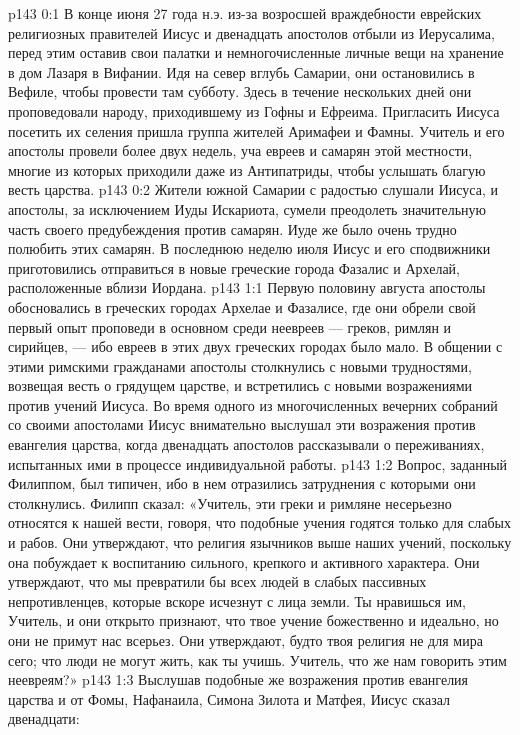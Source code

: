 \author{Комиссия срединников}
\vs p143 0:1 В конце июня 27 года н.э. из\hyp{}за возросшей враждебности еврейских религиозных правителей Иисус и двенадцать апостолов отбыли из Иерусалима, перед этим оставив свои палатки и немногочисленные личные вещи на хранение в дом Лазаря в Вифании. Идя на север вглубь Самарии, они остановились в Вефиле, чтобы провести там субботу. Здесь в течение нескольких дней они проповедовали народу, приходившему из Гофны и Ефреима. Пригласить Иисуса посетить их селения пришла группа жителей Аримафеи и Фамны. Учитель и его апостолы провели более двух недель, уча евреев и самарян этой местности, многие из которых приходили даже из Антипатриды, чтобы услышать благую весть царства.
\vs p143 0:2 Жители южной Самарии с радостью слушали Иисуса, и апостолы, за исключением Иуды Искариота, сумели преодолеть значительную часть своего предубеждения против самарян. Иуде же было очень трудно полюбить этих самарян. В последнюю неделю июля Иисус и его сподвижники приготовились отправиться в новые греческие города Фазалис и Архелай, расположенные вблизи Иордана.
\vs p143 1:1 Первую половину августа апостолы обосновались в греческих городах Архелае и Фазалисе, где они обрели свой первый опыт проповеди в основном среди неевреев --- греков, римлян и сирийцев, --- ибо евреев в этих двух греческих городах было мало. В общении с этими римскими гражданами апостолы столкнулись с новыми трудностями, возвещая весть о грядущем царстве, и встретились с новыми возражениями против учений Иисуса. Во время одного из многочисленных вечерних собраний со своими апостолами Иисус внимательно выслушал эти возражения против евангелия царства, когда двенадцать апостолов рассказывали о переживаниях, испытанных ими в процессе индивидуальной работы.
\vs p143 1:2 Вопрос, заданный Филиппом, был типичен, ибо в нем отразились затруднения с которыми они столкнулись. Филипп сказал: «Учитель, эти греки и римляне несерьезно относятся к нашей вести, говоря, что подобные учения годятся только для слабых и рабов. Они утверждают, что религия язычников выше наших учений, поскольку она побуждает к воспитанию сильного, крепкого и активного характера. Они утверждают, что мы превратили бы всех людей в слабых пассивных непротивленцев, которые вскоре исчезнут с лица земли. Ты нравишься им, Учитель, и они открыто признают, что твое учение божественно и идеально, но они не примут нас всерьез. Они утверждают, будто твоя религия не для мира сего; что люди не могут жить, как ты учишь. Учитель, что же нам говорить этим неевреям?»
\vs p143 1:3 Выслушав подобные же возражения против евангелия царства и от Фомы, Нафанаила, Симона Зилота и Матфея, Иисус сказал двенадцати:
